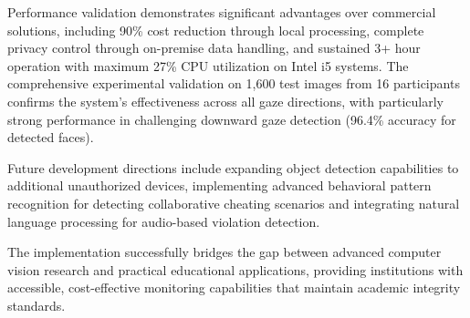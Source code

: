 \documentclass[conference]{IEEEtran}
\begin{document}
Performance validation demonstrates significant advantages over commercial solutions, 
including 90\% cost reduction through local processing, complete privacy control 
through on-premise data handling, and sustained 3+ hour operation with maximum 27\% CPU 
utilization on Intel i5 systems. The comprehensive experimental validation on 1,600 
test images from 16 participants confirms the system's effectiveness across all gaze 
directions, with particularly strong performance in challenging downward gaze detection 
(96.4\% accuracy for detected faces).

Future development directions include expanding object detection capabilities to 
additional unauthorized devices, implementing advanced behavioral pattern recognition 
for detecting collaborative cheating scenarios and integrating natural language 
processing for audio-based violation detection.

The implementation successfully bridges the gap between advanced computer vision research 
and practical educational applications, providing institutions with accessible, 
cost-effective monitoring capabilities that maintain academic integrity standards.
\end{document}
